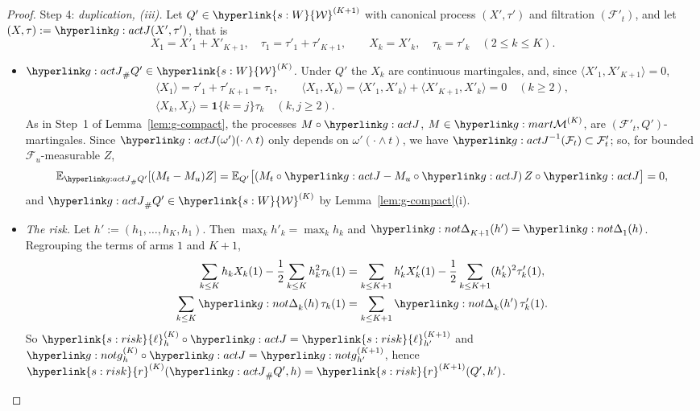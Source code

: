 \documentclass[11pt]{article}
\DeclareRobustCommand{\sy}[2]{{\hyperlink{#1}{#2}}}
\newcommand{\E}{\mathbb{E}}
\newcommand{\1}{\mathbf{1}}
\newcommand{\Wc}{\sy{s:W}{\mathcal W}}
\newcommand{\rk}{\sy{s:risk}{r}}
\newcommand{\lh}{\sy{s:risk}{\ell}}
\begin{document}
\begin{proof}
Step 4: \emph{duplication, (iii).} Let $Q'\in\Wc^{(K+1)}$ with canonical process $(X',\tau')$ and filtration $(\mathcal F'_t)$, and let $(X,\tau):=\gJ(X',\tau')$, that is
\[
X_1=X'_1+X'_{K+1},\quad \tau_1=\tau'_1+\tau'_{K+1},\qquad X_k=X'_k,\quad \tau_k=\tau'_k\quad(2\le k\le K).
\]
\begin{itemize}
\item \emph{$\gJ_\#Q'\in\Wc^{(K)}$.} Under $Q'$ the $X_k$ are continuous martingales, and, since $\langle X'_1,X'_{K+1}\rangle=0$,
\begin{gather*}
\langle X_1\rangle=\tau'_1+\tau'_{K+1}=\tau_1,\qquad \langle X_1,X_k\rangle=\langle X'_1,X'_k\rangle+\langle X'_{K+1},X'_k\rangle=0\quad(k\ge2),\\
\langle X_k,X_j\rangle=\1\{k=j\}\tau_k\quad(k,j\ge2).
\end{gather*}
As in Step~1 of Lemma~\ref{lem:g-compact}, the processes $M\circ\gJ$, $M\in\gMc^{(K)}$, are $(\mathcal F'_t,Q')$-martingales. Since $\gJ(\omega')(\cdot\wedge t)$ only depends on
$\omega'(\cdot\wedge t)$, we have $\gJ^{-1}(\mathcal F_t)\subset\mathcal F'_t$; so, for bounded $\mathcal F_u$-measurable $Z$,
\[
\E_{\gJ_\#Q'}[(M_t-M_u)Z]=\E_{Q'}\big[(M_t\circ\gJ-M_u\circ\gJ)\,Z\circ\gJ\big]=0,
\]
and $\gJ_\#Q'\in\Wc^{(K)}$ by Lemma~\ref{lem:g-compact}(i).
\item \emph{The risk.} Let $h':=(h_1,\dots,h_K,h_1)$. Then $\max_kh'_k=\max_kh_k$ and $\gGp_{K+1}(h')=\gGp_1(h)$. Regrouping the terms of arms $1$ and $K+1$,
\begin{align*}
\sum_{k\le K}h_kX_k(1)-\frac12\sum_{k\le K}h_k^2\tau_k(1)&=\sum_{k\le K+1}h'_kX'_k(1)-\frac12\sum_{k\le K+1}(h'_k)^2\tau'_k(1),\\
\sum_{k\le K}\gGp_k(h)\,\tau_k(1)&=\sum_{k\le K+1}\gGp_k(h')\,\tau'_k(1).
\end{align*}
So $\lh^{(K)}_h\circ\gJ=\lh^{(K+1)}_{h'}$ and $\ggh^{(K)}_h\circ\gJ=\ggh^{(K+1)}_{h'}$, hence $\rk^{(K)}(\gJ_\#Q',h)=\rk^{(K+1)}(Q',h')$.
\end{itemize}
\end{proof}
\end{document}
